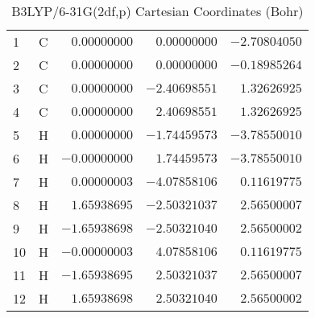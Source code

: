 \documentclass[10pt,oneside]{article}
\begin{document}
\begin{table}[h]
\centering
\caption{B3LYP/6-31G(2df,p) Cartesian Coordinates (Bohr)}
\begin{tabular}{llrrr}
\toprule
1  & C  & $ 0.00000000$ & $ 0.00000000$ & $-2.70804050$ \\
2  & C  & $ 0.00000000$ & $ 0.00000000$ & $-0.18985264$ \\
3  & C  & $ 0.00000000$ & $-2.40698551$ & $ 1.32626925$ \\
4  & C  & $ 0.00000000$ & $ 2.40698551$ & $ 1.32626925$ \\
5  & H  & $ 0.00000000$ & $-1.74459573$ & $-3.78550010$ \\
6  & H  & $-0.00000000$ & $ 1.74459573$ & $-3.78550010$ \\
7  & H  & $ 0.00000003$ & $-4.07858106$ & $ 0.11619775$ \\
8  & H  & $ 1.65938695$ & $-2.50321037$ & $ 2.56500007$ \\
9  & H  & $-1.65938698$ & $-2.50321040$ & $ 2.56500002$ \\
10 & H  & $-0.00000003$ & $ 4.07858106$ & $ 0.11619775$ \\
11 & H  & $-1.65938695$ & $ 2.50321037$ & $ 2.56500007$ \\
12 & H  & $ 1.65938698$ & $ 2.50321040$ & $ 2.56500002$ \\
\bottomrule
\end{tabular}
\end{table}
\end{document}
